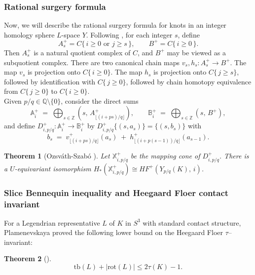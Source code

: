 \documentclass[12pt]{amsart}
\newtheorem{theorem}{Theorem}[section]
\theoremstyle{definition}
\theoremstyle{definition}
\newcommand{\Q}{{\mathbb{Q}}}
\newcommand{\Z}{{\mathbb{Z}}}
\newcommand{\rot}{\text{rot}}
\newcommand{\tb}{\text{tb}}
\newcommand{\HF}{HF}
\begin{document}
\subsubsection*{Rational surgery formula}  Now, we will describe the rational surgery formula for knots in an integer homology sphere $L$-space $Y$. Following \cite{OSzRationalSurgery}, for each integer $s$, define
\[
A_s^+ = C\{\, i \ge 0 \text{ or } j \ge s \,\}, \qquad B^+ = C\{\, i \ge 0 \,\}.
\]
Then $A_s^+$ is a natural quotient complex of $C$, and $B^+$ may be viewed as a subquotient complex. There are two canonical chain maps $v_s, h_s \colon A_s^+ \to B^+$. The map $v_s$ is projection onto $C\{\, i \ge 0 \}$. The map $h_s$ is projection onto $C\{\, j \ge s \}$, followed by identification with $C\{\, j \ge 0 \}$, followed by chain homotopy equivalence from $C\{\, j \ge 0 \}$ to $C\{\, i \ge 0 \}$.\\

Given $p/q \in \Q \setminus \{0\}$, consider the direct sums
\[
\mathbb{A}_i^+ \;=\; \bigoplus_{s \in \Z}
\!\left(s,\, A^+_{\lfloor (i+ps)/q \rfloor}\right), \qquad
\mathbb{B}_i^+ \;=\; \bigoplus_{s \in \Z}
\!\left(s,\, B^+\right),
\]
and define $D^+_{i,p/q} \colon \mathbb{A}_i^+ \to \mathbb{B}_i^+$ by
$D^+_{i,p/q}\{(s,a_s)\} = \{(s,b_s)\}$ with
\begin{equation*}
b_s \;=\; v^+_{\lfloor (i+ps)/q \rfloor}(a_s)
\;+\; h^+_{\lfloor (i+p(s-1))/q \rfloor}(a_{s-1}).
\end{equation*}

\begin{theorem}[Ozsv\'ath-Szab\'o
{\cite[Theorem~9.19]{OSzRationalSurgery}}]\label{thm:rationalsurgeryformula}
Let $\mathbb{X}^+_{i,p/q}$ be the mapping cone of $D^+_{i,p/q}$.
There is a $U$-equivariant isomorphism
$H_*(\mathbb{X}^+_{i,p/q}) \cong \HF^+(Y_{p/q}(K),\, i)$.
\end{theorem}



\subsubsection*{Slice Bennequin inequality and Heegaard Floer contact invariant}

For a Legendrian representative $L$ of $K$ in $S^3$ with standard contact structure, Plamenevskaya\cite{Plamenevskaya2004TB} proved the following lower bound on the Heegaard Floer $\tau$–invariant:
\begin{theorem}[\cite{Plamenevskaya2004TB}]\label{taubound}  
 \[
\tb(L)+|\rot(L)| \le 2\tau(K)-1.
\]  
\end{theorem}
\end{document}
